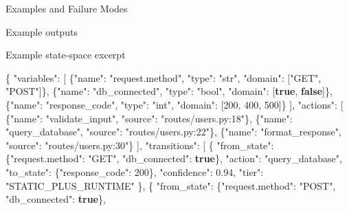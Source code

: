 \documentclass[
  ignorenonframetext,
]{beamer}
\newenvironment{Shaded}{}{}
\newcommand{\DataTypeTok}[1]{\textcolor[rgb]{0.56,0.13,0.00}{#1}}
\newcommand{\DecValTok}[1]{\textcolor[rgb]{0.25,0.63,0.44}{#1}}
\newcommand{\FloatTok}[1]{\textcolor[rgb]{0.25,0.63,0.44}{#1}}
\newcommand{\FunctionTok}[1]{\textcolor[rgb]{0.02,0.16,0.49}{#1}}
\newcommand{\KeywordTok}[1]{\textcolor[rgb]{0.00,0.44,0.13}{\textbf{#1}}}
\newcommand{\OtherTok}[1]{\textcolor[rgb]{0.00,0.44,0.13}{#1}}
\newcommand{\StringTok}[1]{\textcolor[rgb]{0.25,0.44,0.63}{#1}}
\begin{document}
\begin{frame}[fragile]{Examples and Failure Modes}
\begin{block}{Example outputs}
\begin{block}{Example state-space excerpt}
\begin{Shaded}
\begin{Highlighting}[]
\FunctionTok{\{}
  \DataTypeTok{"variables"}\FunctionTok{:} \OtherTok{[}
    \FunctionTok{\{}\DataTypeTok{"name"}\FunctionTok{:} \StringTok{"request.method"}\FunctionTok{,} \DataTypeTok{"type"}\FunctionTok{:} \StringTok{"str"}\FunctionTok{,} \DataTypeTok{"domain"}\FunctionTok{:} \OtherTok{[}\StringTok{"GET"}\OtherTok{,} \StringTok{"POST"}\OtherTok{]}\FunctionTok{\}}\OtherTok{,}
    \FunctionTok{\{}\DataTypeTok{"name"}\FunctionTok{:} \StringTok{"db\_connected"}\FunctionTok{,}   \DataTypeTok{"type"}\FunctionTok{:} \StringTok{"bool"}\FunctionTok{,} \DataTypeTok{"domain"}\FunctionTok{:} \OtherTok{[}\KeywordTok{true}\OtherTok{,} \KeywordTok{false}\OtherTok{]}\FunctionTok{\}}\OtherTok{,}
    \FunctionTok{\{}\DataTypeTok{"name"}\FunctionTok{:} \StringTok{"response\_code"}\FunctionTok{,}  \DataTypeTok{"type"}\FunctionTok{:} \StringTok{"int"}\FunctionTok{,}  \DataTypeTok{"domain"}\FunctionTok{:} \OtherTok{[}\DecValTok{200}\OtherTok{,} \DecValTok{400}\OtherTok{,} \DecValTok{500}\OtherTok{]}\FunctionTok{\}}
  \OtherTok{]}\FunctionTok{,}
  \DataTypeTok{"actions"}\FunctionTok{:} \OtherTok{[}
    \FunctionTok{\{}\DataTypeTok{"name"}\FunctionTok{:} \StringTok{"validate\_input"}\FunctionTok{,} \DataTypeTok{"source"}\FunctionTok{:} \StringTok{"routes/users.py:18"}\FunctionTok{\}}\OtherTok{,}
    \FunctionTok{\{}\DataTypeTok{"name"}\FunctionTok{:} \StringTok{"query\_database"}\FunctionTok{,}  \DataTypeTok{"source"}\FunctionTok{:} \StringTok{"routes/users.py:22"}\FunctionTok{\}}\OtherTok{,}
    \FunctionTok{\{}\DataTypeTok{"name"}\FunctionTok{:} \StringTok{"format\_response"}\FunctionTok{,} \DataTypeTok{"source"}\FunctionTok{:} \StringTok{"routes/users.py:30"}\FunctionTok{\}}
  \OtherTok{]}\FunctionTok{,}
  \DataTypeTok{"transitions"}\FunctionTok{:} \OtherTok{[}
    \FunctionTok{\{}
      \DataTypeTok{"from\_state"}\FunctionTok{:} \FunctionTok{\{}\DataTypeTok{"request.method"}\FunctionTok{:} \StringTok{"GET"}\FunctionTok{,} \DataTypeTok{"db\_connected"}\FunctionTok{:} \KeywordTok{true}\FunctionTok{\},}
      \DataTypeTok{"action"}\FunctionTok{:} \StringTok{"query\_database"}\FunctionTok{,}
      \DataTypeTok{"to\_state"}\FunctionTok{:} \FunctionTok{\{}\DataTypeTok{"response\_code"}\FunctionTok{:} \DecValTok{200}\FunctionTok{\},}
      \DataTypeTok{"confidence"}\FunctionTok{:} \FloatTok{0.94}\FunctionTok{,}
      \DataTypeTok{"tier"}\FunctionTok{:} \StringTok{"STATIC\_PLUS\_RUNTIME"}
    \FunctionTok{\}}\OtherTok{,}
    \FunctionTok{\{}
      \DataTypeTok{"from\_state"}\FunctionTok{:} \FunctionTok{\{}\DataTypeTok{"request.method"}\FunctionTok{:} \StringTok{"POST"}\FunctionTok{,} \DataTypeTok{"db\_connected"}\FunctionTok{:} \KeywordTok{true}\FunctionTok{\},}

\end{Highlighting}
\end{Shaded}
\end{block}
\end{block}
\end{frame}
\end{document}
